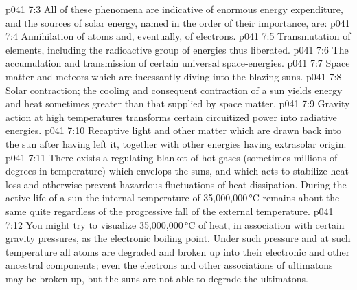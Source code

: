 \vs p041 7:3 \pc All of these phenomena are indicative of enormous energy expenditure, and the sources of solar energy, named in the order of their importance, are:
\vs p041 7:4 \bibnobreakspace Annihilation of atoms and, eventually, of electrons.
\vs p041 7:5 \bibnobreakspace Transmutation of elements, including the radioactive group of energies thus liberated.
\vs p041 7:6 \bibnobreakspace The accumulation and transmission of certain universal space\hyp{}energies.
\vs p041 7:7 \bibnobreakspace Space matter and meteors which are incessantly diving into the blazing suns.
\vs p041 7:8 \bibnobreakspace Solar contraction; the cooling and consequent contraction of a sun yields energy and heat sometimes greater than that supplied by space matter.
\vs p041 7:9 \bibnobreakspace Gravity action at high temperatures transforms certain circuitized power into radiative energies.
\vs p041 7:10 \bibnobreakspace Recaptive light and other matter which are drawn back into the sun after having left it, together with other energies having extrasolar origin.
\vs p041 7:11 \pc There exists a regulating blanket of hot gases (sometimes millions of degrees in temperature) which envelops the suns, and which acts to stabilize heat loss and otherwise prevent hazardous fluctuations of heat dissipation. During the active life of a sun the internal temperature of 35,000,000\,°C remains about the same quite regardless of the progressive fall of the external temperature.
\vs p041 7:12 \pc You might try to visualize 35,000,000\,°C of heat, in association with certain gravity pressures, as the electronic boiling point. Under such pressure and at such temperature all atoms are degraded and broken up into their electronic and other ancestral components; even the electrons and other associations of ultimatons may be broken up, but the suns are not able to degrade the ultimatons.
